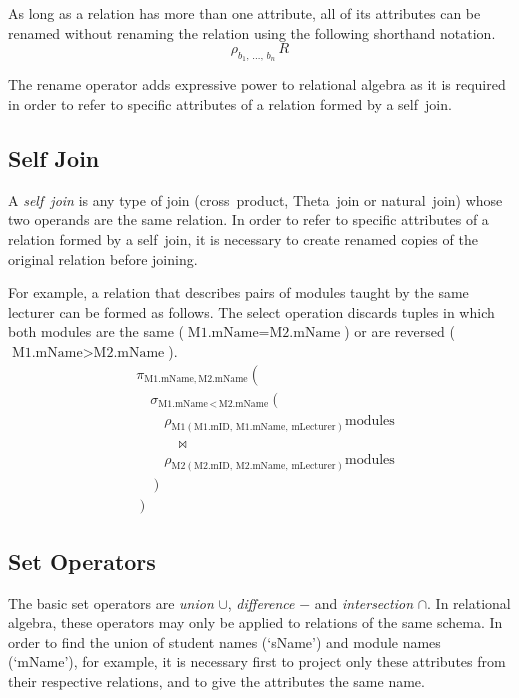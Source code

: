 As long as a relation has more than one attribute, all of its attributes can be renamed without renaming the relation using the following shorthand notation.
\begin{equation*}
  \rho_{b_1,\,\ldots,\,b_n}\,R
\end{equation*}

The rename operator adds expressive power to relational algebra as it is required in order to refer to specific attributes of a relation formed by a self~join.

\subsection{Self Join}

A \emph{self~join} is any type of join (cross~product, Theta~join or natural~join) whose two operands are the same relation.
In order to refer to specific attributes of a relation formed by a self~join, it is necessary to create renamed copies of the original relation before joining.

For example, a relation that describes pairs of modules taught by the same lecturer can be formed as follows.
The select operation discards tuples in which both modules are the same (\( \text{M1.mName} = \text{M2.mName} \)) or are reversed (\( \text{M1.mName} > \text{M2.mName} \)).
\begin{equation*}
  \begin{split}
    & \pi_{\text{M1.mName},\,\text{M2.mName}}\!\left(\right. \\
    & \quad \sigma_{\text{M1.mName}\,<\,\text{M2.mName}}\!\left(\right. \\
    & \quad \quad \rho_{\text{M1}\left( \text{M1.mID},\,\text{M1.mName},\,\text{mLecturer} \right)} \text{modules} \\
    & \quad \quad \quad \bowtie \\
    & \quad \quad \rho_{\text{M2}\left( \text{M2.mID},\,\text{M2.mName},\,\text{mLecturer} \right)} \text{modules} \\
    & \quad \left.\right) \\
    & \left.\right)
  \end{split}
\end{equation*}

\subsection{Set Operators}

The basic set operators are \emph{union} \( \cup \), \emph{difference} \( - \) and \emph{intersection} \( \cap \).
In relational algebra, these operators may only be applied to relations of the same schema.
In order to find the union of student names (`sName') and module names (`mName'), for example, it is necessary first to project only these attributes from their respective relations, and to give the attributes the same name.

